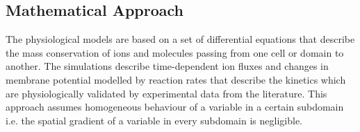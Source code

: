 \subsection{Mathematical Approach}
The physiological models are based on a set of differential equations that describe the mass conservation of ions and molecules passing from one cell or domain to another. The simulations describe time-dependent ion fluxes and changes in membrane potential modelled by reaction rates that describe the kinetics which are physiologically validated by experimental data from the literature. This approach assumes homogeneous behaviour of a variable in a certain subdomain i.e. the spatial gradient of a variable in every subdomain is negligible.

 


